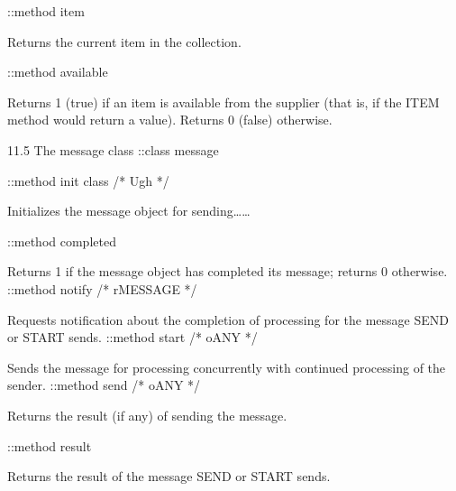 ::method item

Returns the current item in the collection.

::method available

Returns 1 (true) if an item is available from the supplier (that is, if
the ITEM method would return a value). Returns 0 (false) otherwise.

11.5 The message class ::class message

::method init class /* Ugh */

Initializes the message object for sending\ldots\ldots{}

::method completed

Returns 1 if the message object has completed its message; returns 0
otherwise. ::method notify /* rMESSAGE */

Requests notification about the completion of processing for the message
SEND or START sends. ::method start /* oANY */

Sends the message for processing concurrently with continued processing
of the sender. ::method send /* oANY */

Returns the result (if any) of sending the message.

::method result

Returns the result of the message SEND or START sends.
